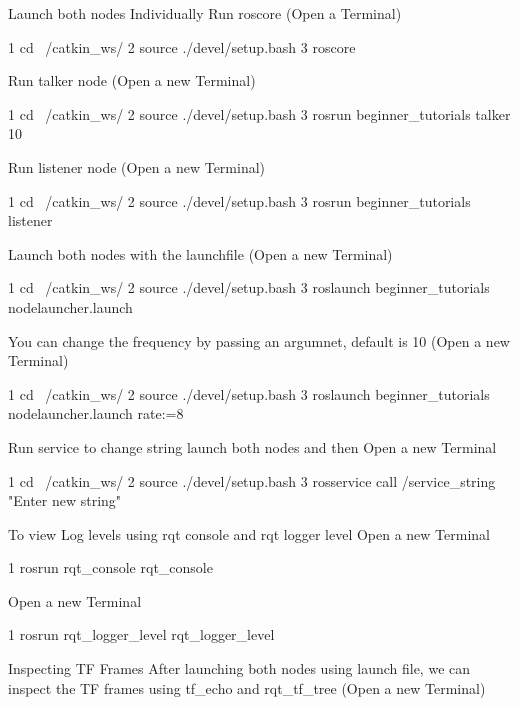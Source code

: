 \begin{DoxyEnumerate}
\item Launch both nodes Individually Run roscore (Open a Terminal) 
\begin{DoxyCode}
1 cd ~/catkin\_ws/
2 source ./devel/setup.bash
3 roscore
\end{DoxyCode}
 Run talker node (Open a new Terminal) 
\begin{DoxyCode}
1 cd ~/catkin\_ws/
2 source ./devel/setup.bash
3 rosrun beginner\_tutorials talker 10
\end{DoxyCode}
 Run listener node (Open a new Terminal) 
\begin{DoxyCode}
1 cd ~/catkin\_ws/
2 source ./devel/setup.bash
3 rosrun beginner\_tutorials listener
\end{DoxyCode}

\item Launch both nodes with the launchfile (Open a new Terminal) 
\begin{DoxyCode}
1 cd ~/catkin\_ws/
2 source ./devel/setup.bash
3 roslaunch beginner\_tutorials nodelauncher.launch
\end{DoxyCode}
 You can change the frequency by passing an argumnet, default is 10 (Open a new Terminal) 
\begin{DoxyCode}
1 cd ~/catkin\_ws/
2 source ./devel/setup.bash
3 roslaunch beginner\_tutorials nodelauncher.launch rate:=8
\end{DoxyCode}

\item Run service to change string launch both nodes and then Open a new Terminal 
\begin{DoxyCode}
1 cd ~/catkin\_ws/
2 source ./devel/setup.bash
3 rosservice call /service\_string "Enter new string"
\end{DoxyCode}

\item To view Log levels using rqt console and rqt logger level Open a new Terminal 
\begin{DoxyCode}
1 rosrun rqt\_console rqt\_console
\end{DoxyCode}
 Open a new Terminal 
\begin{DoxyCode}
1 rosrun rqt\_logger\_level rqt\_logger\_level
\end{DoxyCode}

\item Inspecting TF Frames After launching both nodes using launch file, we can inspect the TF frames using tf\+\_\+echo and rqt\+\_\+tf\+\_\+tree (Open a new Terminal)
\end{DoxyEnumerate}


